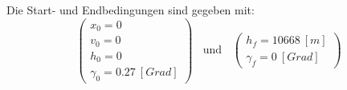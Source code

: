 Die Start- und Endbedingungen sind gegeben mit:
\begin{equation}
\begin{pmatrix}
x_0 = 0 \\ 
v_0 = 0 \\ 
h_0 = 0 \\ 
\gamma_0 = 0.27 \ [Grad]
\end{pmatrix} \ \ \ \ \text{und} \ \ \ \ \begin{pmatrix}
h_f = 10668 \ [m] \\ 
\gamma_f = 0 \ [Grad]
\end{pmatrix}  
\end{equation}









